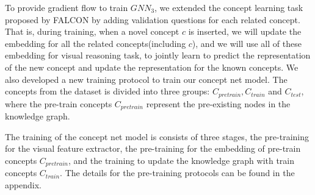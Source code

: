 To provide gradient flow to train $GNN_3$, we extended the concept learning task proposed by FALCON by adding validation questions for each related concept. That is, during training, when a novel concept $c$ is inserted, we will update the embedding for all the related concepts(including $c$), and we will use all of these embedding for visual reasoning task, to jointly learn to predict the representation of the new concept and update the representation for the known concepts.
We also developed a new training protocol to train our concept net model.
The concepts from the dataset is divided into three groups: $C_{pretrain}, C_{train}$ and $C_{test}$, where the pre-train concepts $C_{pretrain}$ represent the pre-existing nodes in the knowledge graph.

The training of the concept net model is consists of three stages, the pre-training for the visual feature extractor, the pre-training for the embedding of pre-train concepts $C_{pretrain}$, and the training to update the knowledge graph with train concepts $C_{train}$.
The details for the pre-training protocols can be found in the appendix.

